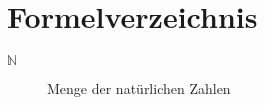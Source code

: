 \chapter{Formelverzeichnis}
\begin{singlespace}
\begin{description}
\item[$\mathbb{N}$] Menge der natürlichen Zahlen
\end{description}
\end{singlespace}